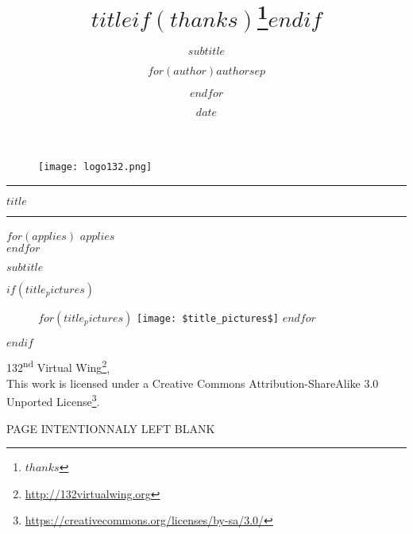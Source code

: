 \documentclass[$if(fontsize)$$fontsize$,$endif$$if(lang)$$babel-lang$,$endif$$if(papersize)$$papersize$paper,$endif$$for(classoption)$$classoption$$sep$,$endfor$]{$documentclass$}
\title{$title$$if(thanks)$\thanks{$thanks$}$endif$}
\subtitle{$subtitle$}
\author{$for(author)$$author$$sep$ \and $endfor$}
\institute{$for(institute)$$institute$$sep$ \and $endfor$}
\date{$date$}
\renewcommand{\href}[2]{#2\footnote{\url{#1}}}
\newcommand{\wing}{132\textsuperscript{nd} Virtual Wing}
\begin{document}
\thispagestyle{empty}

\begin{center}
    \vspace*{\fill}

    \begin{figure}[h]
      \centering
      \texttt{[image: logo132.png]}
    \end{figure}

    \vspace{2cm}

    \noindent\rule{\textwidth}{0.4pt}
    \vspace{0.1cm}

    {\fontsize{2cm}{2.3cm}\selectfont $title$}

    \noindent\rule{\textwidth}{0.4pt}

    $for(applies)$
        $applies$ \\
    $endfor$

    $subtitle$

    $if(title_pictures)$
        \vspace{1cm}
        \begin{figure}[h]
            \begin{minipage}[c]{\linewidth}
                \centering
                $for(title_pictures)$
                      \texttt{[image: \$title\_pictures\$]}
                $endfor$
            \end{minipage}
        \end{figure}
    $endif$

    \vspace{2cm}

    {\href{http://132virtualwing.org}{\wing}}, \the\year \\
    \vspace{0.3cm}
    This work is licensed under a {\href{https://creativecommons.org/licenses/by-sa/3.0/}{Creative Commons Attribution-ShareAlike 3.0 Unported License}}.

    \vfill
\end{center}
\restoregeometry
\newpage
\thispagestyle{empty}
\clearpage
\vspace*{\fill}
\begin{center}
\begin{minipage}{.6\textwidth}
\centering PAGE INTENTIONNALY LEFT BLANK
\end{minipage}
\end{center}
\vfill %
\clearpage
\newpage
\thispagestyle{empty}
\end{document}
